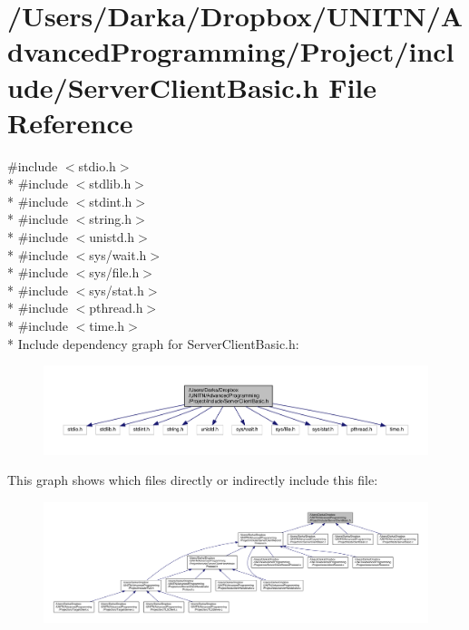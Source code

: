 \section{/\+Users/\+Darka/\+Dropbox/\+U\+N\+I\+T\+N/\+Advanced\+Programming/\+Project/include/\+Server\+Client\+Basic.h File Reference}
\label{_server_client_basic_8h}
{\ttfamily \#include $<$stdio.\+h$>$}\\*
{\ttfamily \#include $<$stdlib.\+h$>$}\\*
{\ttfamily \#include $<$stdint.\+h$>$}\\*
{\ttfamily \#include $<$string.\+h$>$}\\*
{\ttfamily \#include $<$unistd.\+h$>$}\\*
{\ttfamily \#include $<$sys/wait.\+h$>$}\\*
{\ttfamily \#include $<$sys/file.\+h$>$}\\*
{\ttfamily \#include $<$sys/stat.\+h$>$}\\*
{\ttfamily \#include $<$pthread.\+h$>$}\\*
{\ttfamily \#include $<$time.\+h$>$}\\*
Include dependency graph for Server\+Client\+Basic.\+h\+:\nopagebreak
\begin{figure}[H]
\begin{center}
\leavevmode
\includegraphics[width=350pt]{_server_client_basic_8h__incl}
\end{center}
\end{figure}
This graph shows which files directly or indirectly include this file\+:\nopagebreak
\begin{figure}[H]
\begin{center}
\leavevmode
\includegraphics[width=350pt]{_server_client_basic_8h__dep__incl}
\end{center}
\end{figure}
